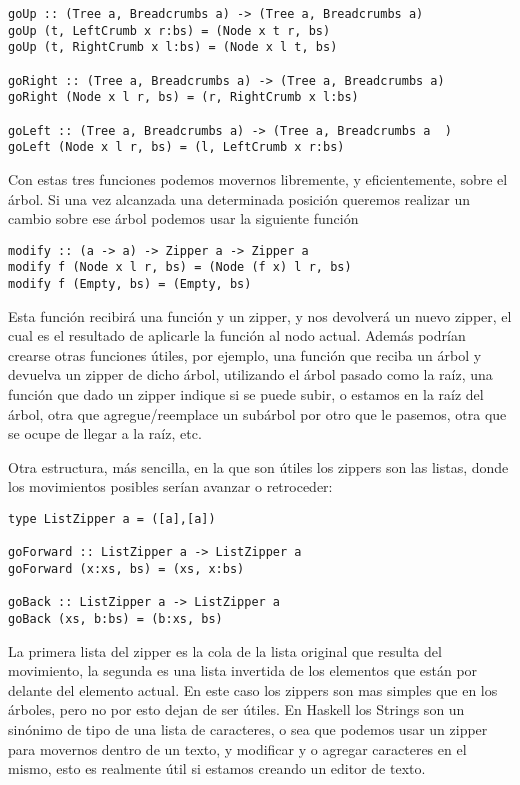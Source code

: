\begin{lstlisting}
goUp :: (Tree a, Breadcrumbs a) -> (Tree a, Breadcrumbs a)
goUp (t, LeftCrumb x r:bs) = (Node x t r, bs)
goUp (t, RightCrumb x l:bs) = (Node x l t, bs)

goRight :: (Tree a, Breadcrumbs a) -> (Tree a, Breadcrumbs a)
goRight (Node x l r, bs) = (r, RightCrumb x l:bs)

goLeft :: (Tree a, Breadcrumbs a) -> (Tree a, Breadcrumbs a  )
goLeft (Node x l r, bs) = (l, LeftCrumb x r:bs)
\end{lstlisting}

Con estas tres funciones podemos movernos libremente, y eficientemente, sobre el árbol. Si una vez alcanzada una determinada posición queremos realizar un cambio sobre ese árbol podemos usar la siguiente función

\begin{lstlisting}
modify :: (a -> a) -> Zipper a -> Zipper a
modify f (Node x l r, bs) = (Node (f x) l r, bs)
modify f (Empty, bs) = (Empty, bs)
\end{lstlisting}

Esta función recibirá una función y un zipper, y nos devolverá un nuevo zipper, el cual es el resultado de aplicarle la función al nodo actual. Además podrían crearse otras funciones útiles, por ejemplo, una función que reciba un árbol y devuelva un zipper de dicho árbol, utilizando el árbol pasado como la raíz, una función que dado un zipper indique si se puede subir, o estamos en la raíz del árbol, otra que agregue/reemplace un subárbol por otro que le pasemos, otra que se ocupe de llegar a la raíz, etc.

Otra estructura, más sencilla, en la que son útiles los zippers son las listas, donde los movimientos posibles serían avanzar o retroceder:

\begin{lstlisting}
type ListZipper a = ([a],[a])

goForward :: ListZipper a -> ListZipper a
goForward (x:xs, bs) = (xs, x:bs)

goBack :: ListZipper a -> ListZipper a
goBack (xs, b:bs) = (b:xs, bs)
\end{lstlisting}

La primera lista del zipper es la cola de la lista original que resulta del movimiento, la segunda es una lista invertida de los elementos que están por delante del elemento actual. En este caso los zippers son mas simples que en los árboles, pero no por esto dejan de ser útiles. En Haskell los Strings son un sinónimo de tipo de una lista de caracteres, o sea que podemos usar un zipper para movernos dentro de un texto, y modificar y o agregar caracteres en el mismo, esto es realmente útil si estamos creando un editor de texto.

